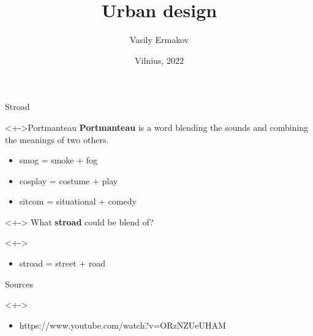 \documentclass{beamer}
\begin{document}
    \title{Urban design}
    \author{Vasily Ermakov}
    \date{Vilnius, 2022}
    \frame{\titlepage}

    \begin{frame}{Stroad}
        \begin{block}
            <+->{Portmanteau}
            \textbf{Portmanteau} is a word blending the sounds and combining the meanings of two others.\\
            \begin{itemize}
                \item smog = smoke + fog
                \item cosplay = costume + play
                \item sitcom = situational + comedy
            \end{itemize}
        \end{block}
        \begin{block}
            <+->{}
            What \textbf{stroad} could be blend of?
        \end{block}
        \begin{block}
            <+->{}
            \begin{itemize}
                \item stroad = street + road
            \end{itemize}
        \end{block}
    \end{frame}

    \begin{frame}{Sources}
        \begin{block}
            <+->{}
            \begin{itemize}
                \item https://www.youtube.com/watch?v=ORzNZUeUHAM
            \end{itemize}
        \end{block}
    \end{frame}
\end{document}
